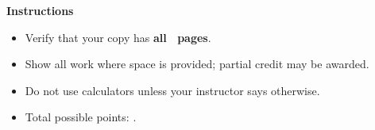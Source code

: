 \documentclass[addpoints]{exam}
\begin{document}
\begin{center}
\end{center}
\vspace{4mm}

\begin{center}
  \textbf{Instructions}
\end{center}
\begin{itemize}
  \item Verify that your copy has \textbf{all \numpages\ pages}.
  \item Show all work where space is provided; partial credit may be awarded.
  \item Do not use calculators unless your instructor says otherwise.
  \item Total possible points: \textbf{\numpoints}.
\end{itemize}
\vspace{4mm}

\newpage
\begin{questions}
  \newpage
\end{questions}
\end{document}
